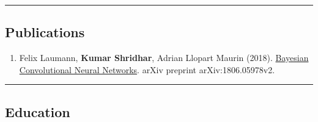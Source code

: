 \documentclass[10pt,letterpaper]{article}
\begin{document}
\hrule
\vspace{-0.4em}
\subsection*{Publications}

\begin{enumerate}
	\parskip=0.1em
	
	
	\item Felix Laumann, \textbf{Kumar Shridhar}, Adrian Llopart Maurin (2018). \href{https://arxiv.org/abs/1806.05978v2}{Bayesian Convolutional Neural Networks}. arXiv preprint arXiv:1806.05978v2.
\end{enumerate}

\hrule
\vspace{-0.4em}
\subsection*{Education}
\end{document}
